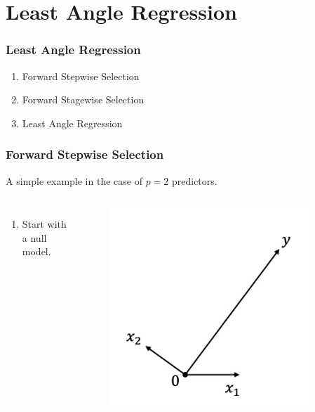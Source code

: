 \section{Least Angle Regression}
\begin{frame}
    \frametitle{Least Angle Regression}
\begin{enumerate}
    \item Forward Stepwise Selection
    \item Forward Stagewise Selection
    \item Least Angle Regression
\end{enumerate}
\end{frame}

\begin{frame}
\frametitle{Forward Stepwise Selection}
A simple example in the case of $p=2$ predictors.

\begin{columns}[t]
    \begin{enumerate}
        \item Start with a null model.
    \end{enumerate}
    
    \begin{figure}[!htbp]
        \begin{center}
            \includegraphics[width=0.9\textwidth]{img/FStepR/1.jpeg}
        \end{center}
    \end{figure}
\end{columns}
\end{frame}

